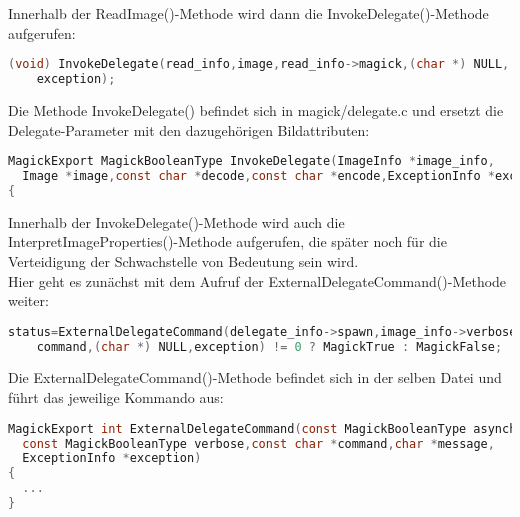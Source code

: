 Innerhalb der ReadImage()-Methode wird dann die InvokeDelegate()-Methode aufgerufen:\\

\begin{lstlisting}[firstnumber=523, language=C, caption=magick/constitue.c Aufruf InvokeDelegate(),label={lst:lstlisting}]
  (void) InvokeDelegate(read_info,image,read_info->magick,(char *) NULL,
    exception);
\end{lstlisting}
\vspace{5mm}

Die Methode InvokeDelegate() befindet sich in magick/delegate.c und ersetzt die Delegate-Parameter mit den dazugehörigen Bildattributen:\\

\begin{lstlisting}[firstnumber=1097, language=C, caption=magick/delegate.c InvokeDelegate(),label={lst:lstlisting}]
MagickExport MagickBooleanType InvokeDelegate(ImageInfo *image_info,
  Image *image,const char *decode,const char *encode,ExceptionInfo *exception)
{
\end{lstlisting}
\vspace{5mm}

Innerhalb der InvokeDelegate()-Methode wird auch die InterpretImageProperties()-Methode aufgerufen, die später noch für die Verteidigung der Schwachstelle von Bedeutung sein wird.\\
Hier geht es zunächst mit dem Aufruf der ExternalDelegateCommand()-Methode weiter:\\

\begin{lstlisting}[firstnumber=1301, language=C, caption=magick/delegate.c Aufruf ExternalDelegateCommand(),label={lst:lstlisting}]
  status=ExternalDelegateCommand(delegate_info->spawn,image_info->verbose,
    command,(char *) NULL,exception) != 0 ? MagickTrue : MagickFalse;
\end{lstlisting}
\vspace{5mm}

Die ExternalDelegateCommand()-Methode befindet sich in der selben Datei und führt das jeweilige Kommando aus:\\

\begin{lstlisting}[firstnumber=346, language=C, caption=magick/delegate.c ExternalDelegateCommand(),label={lst:lstlisting}]
MagickExport int ExternalDelegateCommand(const MagickBooleanType asynchronous,
  const MagickBooleanType verbose,const char *command,char *message,
  ExceptionInfo *exception)
{
  ...
}
\end{lstlisting}
\vspace{5mm}

